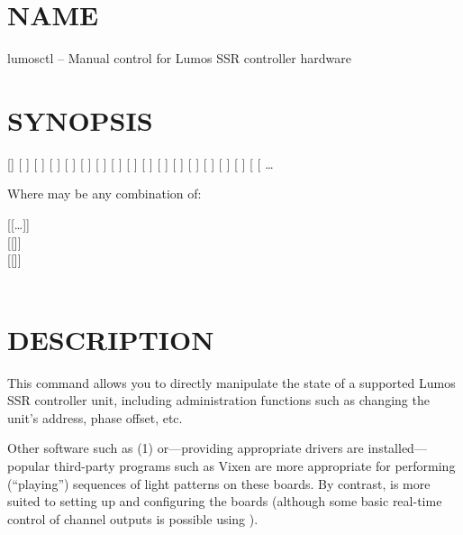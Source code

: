 \section*{NAME}
lumosctl -- Manual control for Lumos SSR controller hardware
\section*{SYNOPSIS}
[]
[
]
[
]
[
]
[
]
[
]
[
]
[
]
[
]
[
]
[
]
[
]
[
]
[
]
[
]
[
]
[
\codetype{:}\codetype{:}\Var*{term\textnormal{]}}
[
\codetype{]}
\dots 


Where
may be any combination of:
\begin{center}


[[\codetype{,}\dots ]]
\\
[[]]
\\
[[]]
\\
\\
\end{center}
\section*{DESCRIPTION}


This command allows you to directly manipulate the state of a
supported Lumos
SSR controller unit, including administration functions
such as changing the unit's address, phase offset, etc.


Other software such as 
(1)
or---providing appropriate drivers are installed---popular
third-party programs such as Vixen are more appropriate for
performing (``playing'') sequences of light patterns on
these boards.  By contrast, 
is more suited to setting up and configuring the boards (although some
basic real-time control of channel outputs is possible using
).


